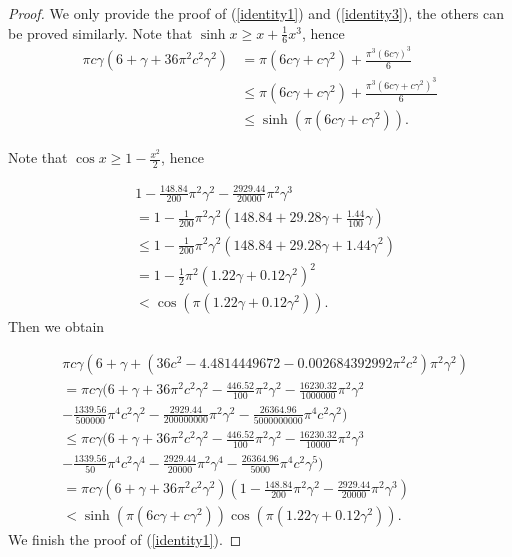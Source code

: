 \documentclass[12pt]{amsart}
\begin{document}
\begin{proof}
We only provide the proof of (\ref{identity1}) and (\ref{identity3}), the others can be proved similarly.  Note that 
$\sinh x\geq x+\frac{1}{6}x^{3}$, hence
\begin{align}
\pi c\gamma\left(  6+\gamma+36\pi^{2}c^{2}\gamma^{2}\right)  &=\pi(6c\gamma+c\gamma^{2})+\frac{\pi^{3}(6c\gamma)^{3}}{6}\\\nonumber
&\leq\pi(6c\gamma+c\gamma^{2})+\frac{\pi^{3}(6c\gamma+c\gamma^{2})^{3}}{6}\\\nonumber
&\leq\sinh(\pi(6c\gamma+c\gamma^{2})).
\end{align}

Note that $\cos x\geq 1-\frac{x^{2}}{2}$, hence

\begin{align}
&1-\frac{148.84}{200}\pi^{2}\gamma^{2}-\frac{2929.44}{20000}\pi^{2}\gamma^{3}\\\nonumber
&=1-\frac{1}{200}\pi^{2}\gamma^{2}(148.84+29.28\gamma+\frac{1.44}{100}%
\gamma)\\\nonumber
&\leq1-\frac{1}{200}\pi^{2}\gamma^{2}(148.84+29.28\gamma+1.44\gamma
^{2})\\\nonumber
&=1-\frac{1}{2}\pi^{2}(1.22\gamma+0.12\gamma^{2})^{2}\\\nonumber
&<\cos(\pi(1.22\gamma+0.12\gamma^{2})).
\end{align}
Then we obtain

\begin{align}
&\pi c\gamma(6+\gamma+(36c^{2}-4.4814449672-0.002684392992\pi^{2}c^{2})\pi
^{2}\gamma^{2})\\\nonumber
&=\pi c\gamma(6+\gamma+36\pi^{2}c^{2}\gamma^{2}-\frac{446.52}{100}\pi
^{2}\gamma^{2}-\frac{16230.32}{1000000}\pi^{2}\gamma^{2}\\\nonumber
&-\frac{1339.56}%
{500000}\pi^{4}c^{2}\gamma^{2}-\frac{2929.44}{200000000}\pi^{2}\gamma
^{2}-\frac{26364.96}{5000000000}\pi^{4}c^{2}\gamma^{2})\\\nonumber
&\leq\pi c\gamma(6+\gamma+36\pi^{2}c^{2}\gamma^{2}-\frac{446.52}{100}\pi
^{2}\gamma^{2}-\frac{16230.32}{10000}\pi^{2}\gamma^{3}\\\nonumber
&-\frac{1339.56}{50}%
\pi^{4}c^{2}\gamma^{4}-\frac{2929.44}{20000}\pi^{2}\gamma^{4}-\frac
{26364.96}{5000}\pi^{4}c^{2}\gamma^{5})\\\nonumber
&=\pi c\gamma\left(  6+\gamma+36\pi^{2}c^{2}\gamma^{2}\right)  (1-\frac
{148.84}{200}\pi^{2}\gamma^{2}-\frac{2929.44}{20000}\pi^{2}\gamma^{3})\\\nonumber
&<\sinh(\pi(6c\gamma+c\gamma^{2}))\cos(\pi(1.22\gamma+0.12\gamma^{2})).
\end{align}
We finish the proof of (\ref{identity1}).



\end{proof}
\end{document}
